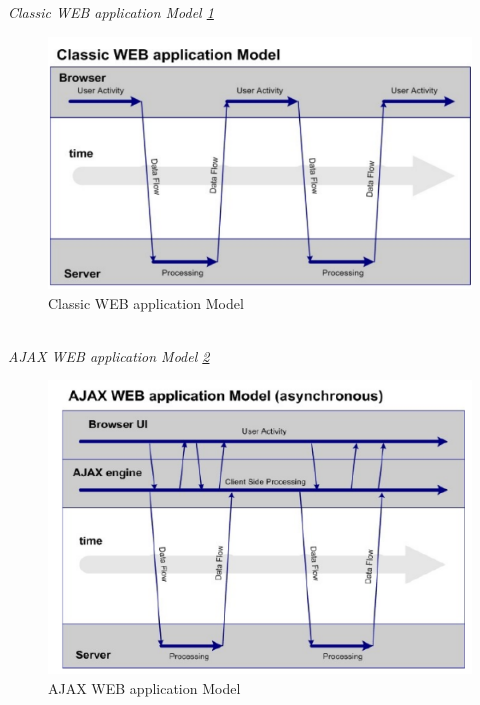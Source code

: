 \documentclass[12pt]{article}
\begin{document}
				\textit{Classic WEB application Model \ref{fig:35}}\\
				\begin{figure}[h!]
					\centering
					\includegraphics[scale=0.60]{img/web.PNG}
					\caption{Classic WEB application Model \label{fig:35}}
				\end{figure}\\
				
				\textit{AJAX WEB application Model \ref{fig:36}}\\
				\begin{figure}[h!]
					\centering
					\includegraphics[scale=0.60]{img/ajax.PNG}
					\caption{AJAX WEB application Model \label{fig:36}}
				\end{figure}\\
				
\end{document}
